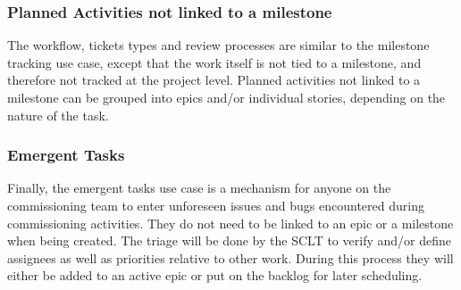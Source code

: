 \documentclass[SE,authoryear,toc]{lsstdoc}
\begin{document}
\subsubsection{Planned Activities not linked to a milestone}
The workflow, tickets types and review processes are similar to the milestone tracking use case, except that the work itself is not tied to a milestone, and therefore not tracked at the project level.
Planned activities not linked to a milestone can be grouped into epics and/or individual stories, depending on the nature of the task.


\subsubsection{Emergent Tasks}
Finally, the emergent tasks use case is a mechanism for anyone on the commissioning team to enter unforeseen issues and bugs encountered during commissioning activities. 
They do not need to be linked to an epic or a milestone when being created. 
The triage will be done by the SCLT to verify and/or define assignees as well as priorities relative to other work. 
During this process they will either be added to an active epic or put on the backlog for later scheduling.
\end{document}
